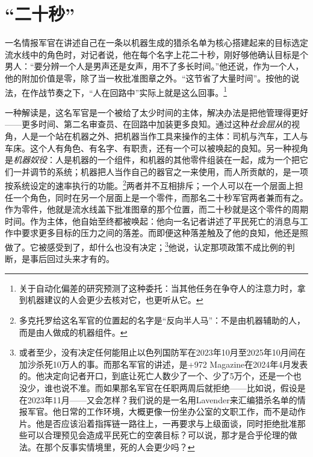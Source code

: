 \chapter{“二十秒”}
\label{sec:1}
一名情报军官在讲述自己在一条以机器生成的猎杀名单为核心搭建起来的目标选定流水线中的角色时，对记者说，他在每个名字上花二十秒，刚好够他确认目标是个男人：“要分辨一个人是男声还是女声，用不了多长时间。”他还说，作为一个人，他的附加价值是零，除了当一枚批准图章之外。“这节省了大量时间”\autocite{abraham2024lavender}。按他的说法，在作战节奏之下，“人在回路中”实际上就是这么回事。\footnote{关于自动化偏差的研究预测了这种委托：当其他任务在争夺人的注意力时，拿到机器建议的人会更少去核对它，也更听从它\autocite{parasuraman2010complacency}。}

一种解读是，这名军官是一个被给了太少时间的主体，解决办法是把他管理得更好——更多时间、第二名审查员、在回路中加装更多良知。通过这种\emph{社会屈从}的视角，人是一个站在机器之外、把机器当作工具来操作的主体：司机与汽车，工人与车床。这个人有角色、有名字、有职责，还有一个可以被唤起的良知。另一种视角是\emph{机器奴役}：人是机器的一个组件，和机器的其他零件组装在一起，成为一个把它们一并调节的系统；机器把人当作自己的器官之一来使用，而人所贡献的，是一项按系统设定的速率执行的功能。\footnote{多克托罗给这名军官的位置起的名字是“反向半人马”：不是由机器辅助的人，而是由人做成的机器组件\autocite{doctorow2026reversecentaur}。}两者并不互相排斥；一个人可以在一个层面上担任一个角色，同时在另一个层面上是一个零件\autocite[高原13，“The Apparatus of Capture”：当人类本身就是一台机器的组成部件，这台机器由他们彼此之间以及与其他事物共同构成，并受一个更高的统一体控制和指挥时，就有了奴役；当这个更高的统一体把人构建为一个主体，与一个新的外部客体相连——这个客体可以是一只动物、一件工具，甚至是一台机器——时，就有了屈从]{deleuze1987plateaus}，而那名二十秒军官两者兼而有之。作为零件，他就是流水线盖下批准图章的那个位置，而二十秒就是这个零件的周期时间。作为主体，他自始至终都被唤起：他向一名记者讲述了平民死亡的消息与工作中要求更多目标的压力之间的落差。而即便这种落差触及了他的良知，他还是照做了。它被感受到了，却什么也没有决定；\footnote{或者至少，没有决定任何能阻止以色列国防军在2023年10月至2025年10月间在加沙杀死10万人的事\autocite{gomezugarte2025uncertainty,acosta2026gaza,economist2025gaza}。而那名军官的讲述，是+972 Magazine在2024年4月发表的。他决定向记者开口，到底让死亡人数少了一个、少了5万个，还是一个也没少，谁也说不准。而如果那名军官在任职两周后就拒绝——比如说，假设是在2023年11月——又会怎样？我们说的是一名用Lavender来汇编猎杀名单的情报军官。他日常的工作环境，大概更像一份坐办公室的文职工作，而不是动作片。他是否应该沿着指挥链一路往上，一再要求与上级面谈，同时拒绝批准那些可以合理预见会造成平民死亡的空袭目标？可以说，那才是合乎伦理的做法。在那个反事实情境里，死的人会更少吗？}他说，认定那项政策不成比例的判断，是事后回过头来才有的。

